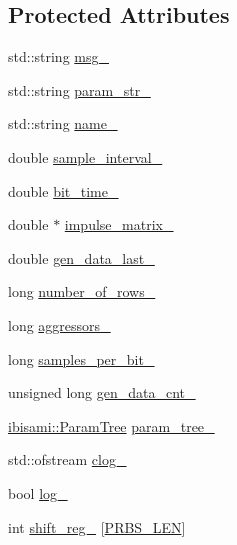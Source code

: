 \subsection*{Protected Attributes}
\begin{DoxyCompactItemize}
\item 
std\+::string \hyperlink{class_a_m_i_model_acc9d4703088b0a69f649c84a1e134cfd}{msg\+\_\+}
\item 
std\+::string \hyperlink{class_a_m_i_model_ab7aeef08245acc654271341cdf0139f9}{param\+\_\+str\+\_\+}
\item 
std\+::string \hyperlink{class_a_m_i_model_a42e00992da9baf93d81d1d9fcd32d8e6}{name\+\_\+}
\item 
double \hyperlink{class_a_m_i_model_a4d4c286b04668c22f2e3f315715a6d5b}{sample\+\_\+interval\+\_\+}
\item 
double \hyperlink{class_a_m_i_model_ad0b6751b3b3a69fb8951fde0fcdf4f27}{bit\+\_\+time\+\_\+}
\item 
double $\ast$ \hyperlink{class_a_m_i_model_a26c35bff12c048655bdbd8663a2f0f58}{impulse\+\_\+matrix\+\_\+}
\item 
double \hyperlink{class_a_m_i_model_aa9cacd5650a194a6f08552f2748bab7a}{gen\+\_\+data\+\_\+last\+\_\+}
\item 
long \hyperlink{class_a_m_i_model_aaaf94b76a519e60318e1874bb190e9a8}{number\+\_\+of\+\_\+rows\+\_\+}
\item 
long \hyperlink{class_a_m_i_model_aab3a042b2459b4b838cb61bf92a50d03}{aggressors\+\_\+}
\item 
long \hyperlink{class_a_m_i_model_ac664a9c24d4fdc43ab15df7023ab04bc}{samples\+\_\+per\+\_\+bit\+\_\+}
\item 
unsigned long \hyperlink{class_a_m_i_model_ad8680b8371b9c476d046ff87d843fbe9}{gen\+\_\+data\+\_\+cnt\+\_\+}
\item 
\hyperlink{structibisami_1_1_param_tree}{ibisami\+::\+Param\+Tree} \hyperlink{class_a_m_i_model_a4da53456e13a1224f2bb47396ab0ecbd}{param\+\_\+tree\+\_\+}
\item 
std\+::ofstream \hyperlink{class_a_m_i_model_a9b1c44767e4e81c4dfcff9bc23907b6c}{clog\+\_\+}
\item 
bool \hyperlink{class_a_m_i_model_ae701c08f6c4b0d962df4a2f2dcb6196b}{log\+\_\+}
\item 
int \hyperlink{class_a_m_i_model_a68e4cdd12afbc4eb60dbefa4cce82a61}{shift\+\_\+reg\+\_\+} \mbox{[}\hyperlink{amimodel_8h_ab851168a21246c759c23a126c192360f}{P\+R\+B\+S\+\_\+\+L\+E\+N}\mbox{]}
\end{DoxyCompactItemize}


